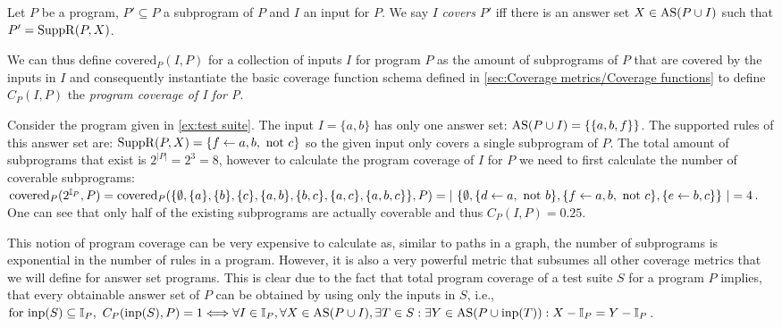 \begin{definition}
\label{def:program coverage}
    Let $P$ be a program, \(P' \subseteq P\) a subprogram of $P$ and $I$ an input for $P$. We say $I$ \emph{covers} $P'$ iff there is an answer set \(X \in \operatorname{AS}(P \cup I)\) such that \(P' = \operatorname{SuppR}(P, X)\).
\end{definition}

We can thus define \(\text{covered}_P(I, P)\) for a collection of inputs $I$ for program $P$ as the amount of subprograms of $P$ that are covered by the inputs in $I$ and consequently instantiate the basic coverage function schema defined in \cref{sec:Coverage metrics/Coverage functions} to define \(C_P(I, P)\) the \emph{program coverage of I for P}.

\begin{example}
\label{ex:program coverage}
    Consider the program given in \cref{ex:test suite}. The input \(I = \{a, b\}\) has only one answer set: \(\operatorname{AS}(P \cup I) = \{\{a, b, f\}\}\). The supported rules of this answer set are: \(\SuppR(P, X) = \{f \leftarrow a, b,\ \text{not}\ c\}\) so the given input only covers a single subprogram of $P$. The total amount of subprograms that exist is \(2^{|P|} = 2^3 = 8\), however to calculate the program coverage of $I$ for $P$ we need to first calculate the number of coverable subprograms: \(\text{covered}_P(2^{\mathbb{I}_P},P) = \text{covered}_P(\{\emptyset, \{a\}, \{b\}, \{c\}, \{a, b\}, \{b, c\}, \{a, c\}, \\ \{a, b, c\}\},P) = |\ \{\emptyset, \{d \leftarrow a,\ \text{not}\ b\}, \{f \leftarrow a, b,\ \text{not}\ c\}, \{e \leftarrow b, c\}\}\ | = 4\). One can see that only half of the existing subprograms are actually coverable and thus \(C_P(I, P) = 0.25\).
\end{example}

This notion of program coverage can be very expensive to calculate as, similar to paths in a graph, the number of subprograms is exponential in the number of rules in a program. However, it is also a very powerful metric that subsumes all other coverage metrics that we will define for answer set programs. This is clear due to the fact that total program coverage of a test suite $S$ for a program $P$ implies, that every obtainable answer set of $P$ can be obtained by using only the inputs in $S$, i.e., 
\(
    \text{for inp}(S) \subseteq \mathbb{I}_P,\ C_P(\operatorname{inp}(S),P) = 1 \Longleftrightarrow \forall I \in \mathbb{I}_P, \forall X \in \operatorname{AS}(P \cup I), \exists T \in S: \exists Y \in \operatorname{AS}(P \cup \operatorname{inp}(T)) : X - \mathbb{I}_P = Y - \mathbb{I}_P
\).

